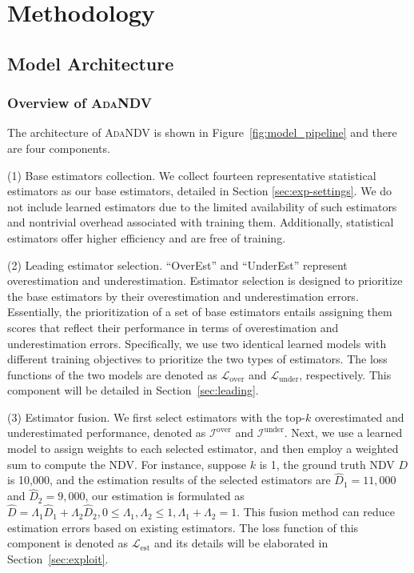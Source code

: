 \section{Methodology}\label{sec:methodology}
\subsection{Model Architecture}\label{sec:architecture}

\subsubsection{Overview of \textsc{AdaNDV}}\label{sec:overview-base}
The architecture of \textsc{AdaNDV} is shown in Figure~\ref{fig:model_pipeline} and there are four components.


\noindent (1) Base estimators collection. We collect fourteen representative statistical estimators as our base estimators, detailed in Section \ref{sec:exp-settings}. We do not include learned estimators due to the limited availability of such estimators and nontrivial overhead associated with training them. Additionally, statistical estimators offer higher efficiency and are free of training.

\noindent (2) Leading estimator selection. ``OverEst'' and ``UnderEst'' represent overestimation and underestimation. Estimator selection is designed to prioritize the base estimators by their overestimation and underestimation errors. Essentially, the prioritization of a set of base estimators entails assigning them scores that reflect their performance in terms of overestimation and underestimation errors. 
Specifically, we use two identical learned models with different training objectives to prioritize the two types of estimators. The loss functions of the two models are denoted as $\mathcal{L}_{\mathrm{over}}$ and $\mathcal{L}_{\mathrm{under}}$, respectively. This component will be detailed in Section~\ref{sec:leading}.


\noindent (3) Estimator fusion. We first select estimators with the top-$k$ overestimated and underestimated performance, denoted as $\mathcal{I}^{\mathrm{over}}$ and $\mathcal{I}^{\mathrm{under}}$. Next, we use a learned model to assign weights to each selected estimator, and then employ a weighted sum to compute the NDV. 
For instance, suppose $k$ is 1, the ground truth NDV $D$ is 10,000, and the estimation results of the selected estimators are $\hat{D}_1=11,000$ and $\hat{D}_2=9,000$, our estimation is formulated as $\hat{D}=\Lambda_1\hat{D}_1+\Lambda_2\hat{D}_2, 0\leq \Lambda_1,\Lambda_2\leq 1, \Lambda_1+\Lambda_2=1$. This fusion method can reduce estimation errors based on existing estimators.
The loss function of this component is denoted as $\mathcal{L}_{\mathrm{est}}$ and its details will be elaborated in Section~\ref{sec:exploit}.

